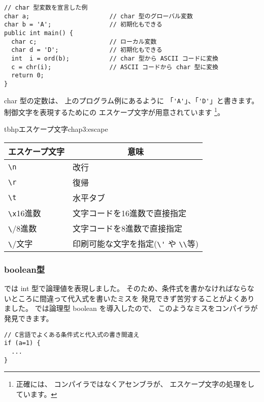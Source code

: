 \begin{mylist}
\begin{verbatim}
// char 型変数を宣言した例
char a;                      // char 型のグローバル変数
char b = 'A';                // 初期化もできる
public int main() {
  char c;                    // ローカル変数
  char d = 'D';              // 初期化もできる
  int  i = ord(b);           // char 型から ASCII コードに変換
  c = chr(i);                // ASCII コードから char 型に変換
  return 0;
}
\end{verbatim}
\end{mylist}

char 型の定数は、
上のプログラム例にあるように 「\verb/'A'/」、「\verb/'D'/」と書きます。
制御文字を表現するためにの
エスケープ文字が用意されています
\footnote{正確には、
コンパイラではなくアセンブラが、
エスケープ文字の処理をしています。}。


\begin{mytable}{tbhp}{エスケープ文字}{chap3:escape}
\begin{tabular}{ll}
\hline
\multicolumn{1}{c}{エスケープ文字} & \multicolumn{1}{c}{意味} \\
\hline
\verb/\n/ & 改行 \\
\verb/\r/ & 復帰 \\
\verb/\t/ & 水平タブ \\
\verb/\x/16進数 & 文字コードを16進数で直接指定 \\
\verb/\/8進数 & 文字コードを8進数で直接指定 \\
\verb/\/文字 & 印刷可能な文字を指定(\verb/\'/ や \verb/\\/等) \\
\hline
\end{tabular}
\end{mytable}

\subsubsection{boolean型}

\cl では int 型で論理値を表現しました。
そのため、条件式を書かなければならないところに間違って代入式を書いたミスを
発見できず苦労することがよくありました。
\cmml では論理型 boolean を導入したので、
このようなミスをコンパイラが発見できます。

\begin{mylist}
\begin{verbatim}
// C言語でよくある条件式と代入式の書き間違え
if (a=1) {
  ...
}
\end{verbatim}
\end{mylist}

